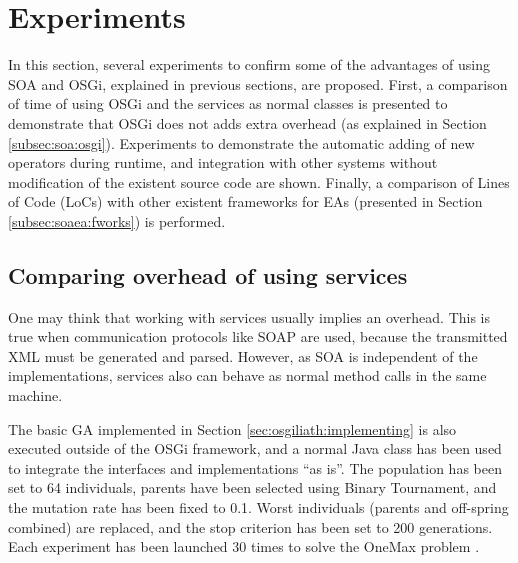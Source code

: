 \section{Experiments} %
In this section, several experiments to confirm some of the advantages of using SOA and OSGi, explained in previous sections, are proposed. First, a comparison of time of using OSGi and the services as normal classes is presented to demonstrate that OSGi does not adds extra overhead (as explained in Section \ref{subsec:soa:osgi}). Experiments to demonstrate the automatic adding of new operators during runtime, and integration with other systems without modification of the existent source code are shown. Finally, a comparison of Lines of Code (LoCs) with other existent frameworks for EAs (presented in Section \ref{subsec:soaea:fworks}) is performed.

\subsection{Comparing overhead of using services}
One may think that working with services usually implies an
overhead. This is true when communication protocols like SOAP are
used, because the transmitted XML must be generated and
parsed. However, as SOA is independent of the implementations,
services also can behave as normal method calls in the same machine. 


 The basic GA implemented in Section \ref{sec:osgiliath:implementing} is also executed outside of
 the OSGi framework, and a normal Java class has been used to
 integrate the interfaces and implementations ``as is''. The
 population has been set to 64 individuals, parents have been selected
 using Binary Tournament, and the mutation rate has been fixed to
 0.1. %
Worst individuals (parents and off-spring combined) are replaced, and
the stop criterion has been set to 200 generations. Each experiment
has been launched 30 times to solve the OneMax problem
\cite{SchafferOnemax91}. 

